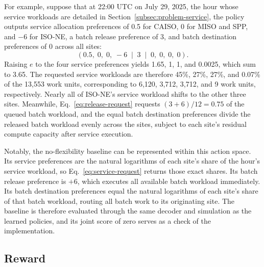 \documentclass{UNCC-thesis}
\begin{document}
For example, suppose that at 22:00 UTC on July 29, 2025, the hour whose service workloads
are detailed in Section~\ref{subsec:problem-service}, the policy outputs service allocation
preferences of 0.5 for CAISO, 0 for MISO and SPP, and \(-6\) for ISO-NE, a batch release
preference of 3, and batch destination preferences of 0 across all sites:
\[
  (0.5,\;0,\;0,\;-6 \;\mid\; 3 \;\mid\; 0,\;0,\;0,\;0).
\]
Raising \(e\) to the four service preferences yields 1.65, 1, 1, and 0.0025, which sum to
3.65. The requested service workloads are therefore 45\%, 27\%, 27\%, and 0.07\% of the 13,553
work units, corresponding to 6,120, 3,712, 3,712, and 9 work units, respectively. Nearly all
of ISO-NE's service workload shifts to the other three sites. Meanwhile,
Eq.~\eqref{eq:release-request} requests
\((3+6)/12=0.75\) of the queued batch workload, and the equal batch destination preferences
divide the released batch workload evenly across the sites, subject to each site's residual
compute capacity after service execution.

Notably, the no-flexibility baseline can be represented within this action space. Its service
preferences are the natural logarithms of each site's share of the hour's service workload, so
Eq.~\eqref{eq:service-request} returns those exact shares. Its batch release
preference is \(+6\), which executes all available batch workload immediately. Its batch
destination preferences equal the natural logarithms of each site's share of that batch
workload, routing all batch work to its originating site. The baseline is therefore evaluated
through the same decoder and simulation as the learned policies, and its joint score of zero
serves as a check of the implementation.

\subsection{Reward}
\label{sec:method-reward}
\end{document}
